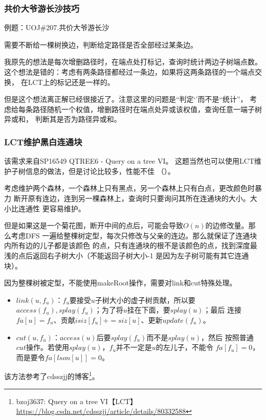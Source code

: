 \subsubsection{共价大爷游长沙技巧}
例题：UOJ\#207.共价大爷游长沙

需要不断给一棵树换边，判断给定路径是否全部经过某条边。

我原先的想法是每次增删路径时，在端点处打标记，查询时统计两边子树端点数。
这个想法是错的：考虑有两条路径都经过一条边，如果将这两条路径的一个端点交换，
在LCT上的标记还是一样的。

但是这个想法离正解已经很接近了。注意这里的问题是``判定‘'而不是``统计''，
考虑给每条路径随机一个权值，增删路径时在端点处异或该权值，查询任意一端子树异或和，
判断其是否为路径异或和。
\subsubsection{LCT维护黑白连通块}
该需求来自SP16549 QTREE6 - Query on a tree VI。
这题当然也可以使用LCT维护子树信息的做法，但是讨论比较多，性能不佳
（）。

考虑维护两个森林，一个森林上只有黑点，另一个森林上只有白点，更改颜色时暴力
断开原有连边，连到另一棵森林上，查询时只要询问其所在连通块的大小。大小比连通性
更容易维护。

但是如果这是一个菊花图，断开中间的点后，可能会导致$O(n)$的边修改量。那么考虑DFS
一遍给整棵树定型，每次只修改与父亲的连边。那么就保证了连通块内所有边的儿子都是该颜色
的点，只有连通块的根不是该颜色的点，找到深度最浅的点后返回右子树大小（不能返回子树大小-1
是因为左子树可能有其它连通块）。

因为整棵树被定型，不能使用makeRoot操作，需要对link和cut特殊处理。

\begin{itemize}
    \item $link(u,f_u)$：$f_u$要接受$u$子树大小的虚子树贡献，所以要
    $access(f_u),splay(f_u)$；为了将$u$挂在下面，要$splay(u)$；最后
    连接$fa[u]=f_u$、贡献$isiz[f_u]+=siz[u]$、更新$update(f_u)$。
    \item $cut(u,f_u)$：$access(u)$后要$splay(f_u)$而不是$splay(u)$，然后
    按照普通$cut$操作。若使用$splay(u)$，$f_u$并不一定是$u$的左儿子，不能令
    $fa[f_u]=0$，而是要令$fa[lson[u]]=0$。
\end{itemize}

该方法参考了cdsszjj的博客\footnote{
    bzoj3637: Query on a tree VI【LCT】\\
    \url{https://blog.csdn.net/cdsszjj/article/details/80332588}
}。
